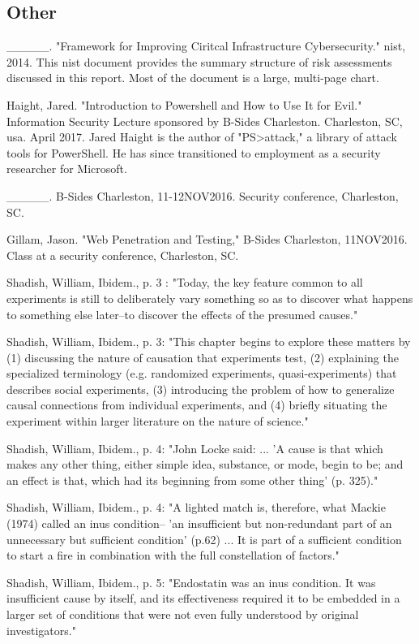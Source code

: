 \subsection{Other}
\_\_\_\_\_. "Framework for Improving Ciritcal Infrastructure Cybersecurity." \gls{nist}, 2014. This \gls{nist} document provides the summary structure of risk assessments discussed in this report. Most of the document is a large, multi-page chart.

Haight, Jared. "Introduction to Powershell and How to Use It for Evil." Information Security Lecture sponsored by B-Sides Charleston. Charleston, SC, \gls{usa}. April 2017. Jared Haight is the author of "PS>\gls{attack}," a library of \gls{attack} tools for PowerShell. He has since transitioned to employment as a security researcher for Microsoft.

\_\_\_\_\_. B-Sides Charleston, 11-12NOV2016. Security conference, Charleston, SC.

Gillam, Jason. "Web Penetration and Testing," B-Sides Charleston, 11NOV2016. Class at a security conference, Charleston, SC.

Shadish, William, Ibidem., p. 3 : "Today, the key feature common to all experiments is still to deliberately vary something so as to discover what happens to something else later--to discover the effects of the presumed causes."

Shadish, William, Ibidem., p. 3: "This chapter begins to explore these matters by (1) discussing the nature of causation that experiments test, (2) explaining the specialized terminology (e.g. randomized experiments, quasi-experiments) that describes social experiments, (3) introducing the problem of how to generalize causal connections from individual experiments, and (4) briefly situating the experiment within larger literature on the nature of science."

Shadish, William, Ibidem., p. 4: "John Locke said: ... 'A cause is that which makes any other thing, either simple idea, substance, or mode, begin to be; and an effect is that, which had its beginning from some other thing' (p. 325)."

Shadish, William, Ibidem., p. 4: "A lighted match is, therefore, what Mackie (1974) called an inus condition-- 'an insufficient but non-redundant part of an unnecessary but sufficient condition' (p.62) ... It is part of a sufficient condition to start a fire in combination with the full constellation of factors."

Shadish, William, Ibidem., p. 5: "Endostatin was an inus condition. It was insufficient cause by itself, and its effectiveness required it to be embedded in a larger set of conditions that were not even fully understood by original investigators."

